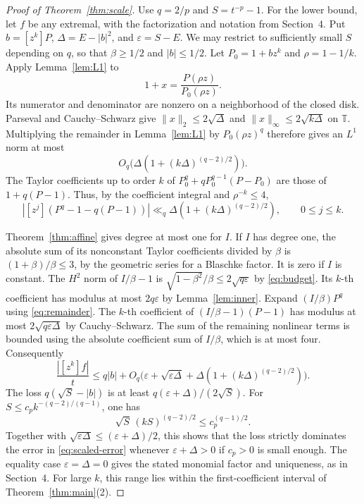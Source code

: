 \documentclass[11pt]{article}
\numberwithin{equation}{section}
\theoremstyle{remark}
\newcommand{\T}{\mathbb T}
\newcommand{\norm}[1]{\lVert #1\rVert}
\newcommand{\coef}[1]{[z^{#1}]}
\begin{document}
\begin{proof}[Proof of Theorem~\ref{thm:scale}]
Use \(q=2/p\) and \(S=t^{-p}-1\). For the lower bound, let \(f\)
be any extremal, with the factorization and notation from Section~4.
Put \(b=\coef{k}P\), \(\Delta=E-|b|^2\), and \(\varepsilon=S-E\).
We may restrict to sufficiently small \(S\) depending on \(q\),
so that \(\beta\ge1/2\) and \(|b|\le1/2\).
Let \(P_0=1+bz^k\) and \(\rho=1-1/k\).
Apply Lemma~\ref{lem:L1} to
\[
  1+x=\frac{P(\rho z)}{P_0(\rho z)} .
\]
Its numerator and denominator are nonzero on a neighborhood of the
closed disk. Parseval and Cauchy--Schwarz give
\(\norm{x}_2\le2\sqrt{\Delta}\) and
\(\norm{x}_\infty\le2\sqrt{k\Delta}\) on \(\T\).
Multiplying the remainder in Lemma~\ref{lem:L1} by \(P_0(\rho z)^q\)
therefore gives an \(L^1\) norm at most
\[
 O_q\bigl(\Delta(1+(k\Delta)^{(q-2)/2})\bigr).
\]
The Taylor coefficients up to order \(k\) of
\(P_0^q+qP_0^{q-1}(P-P_0)\) are those of \(1+q(P-1)\).
Thus, by the coefficient integral and \(\rho^{-k}\le4\),
\begin{equation}\label{eq:remainder}
 |\coef{j}(P^q-1-q(P-1))|
   \ll_q \Delta(1+(k\Delta)^{(q-2)/2}),\qquad 0\le j\le k .
\end{equation}

Theorem~\ref{thm:affine} gives degree at most one for \(I\).
If \(I\) has degree one, the absolute sum of its nonconstant
Taylor coefficients divided by \(\beta\) is
\((1+\beta)/\beta\le3\), by the geometric series for a Blaschke
factor. It is zero if \(I\) is constant.
The \(H^2\) norm of \(I/\beta-1\) is
\(\sqrt{1-\beta^2}/\beta\le2\sqrt{q\varepsilon}\) by
\eqref{eq:budget}. Its \(k\)-th coefficient has modulus at most
\(2q\varepsilon\) by Lemma~\ref{lem:inner}.
Expand \((I/\beta)P^q\) using \eqref{eq:remainder}.
The \(k\)-th coefficient of \((I/\beta-1)(P-1)\) has modulus at most
\(2\sqrt{q\varepsilon\Delta}\) by Cauchy--Schwarz.
The sum of the remaining nonlinear terms is bounded using the
absolute coefficient sum of \(I/\beta\), which is at most four.
Consequently
\begin{equation}\label{eq:scaled-error}
 \frac{|\coef{k}f|}{t}
   \le q|b|+O_q\bigl(\varepsilon+\sqrt{\varepsilon\Delta}
                 +\Delta(1+(k\Delta)^{(q-2)/2})\bigr).
\end{equation}
The loss \(q(\sqrt S-|b|)\) is at least
\(q(\varepsilon+\Delta)/(2\sqrt S)\).
For \(S\le c_p k^{-(q-2)/(q-1)}\), one has
\[
 \sqrt S\,(kS)^{(q-2)/2}\le c_p^{(q-1)/2}.
\]
Together with \(\sqrt{\varepsilon\Delta}\le(\varepsilon+\Delta)/2\),
this shows that the loss strictly dominates the error in
\eqref{eq:scaled-error} whenever \(\varepsilon+\Delta>0\) if \(c_p>0\)
is small enough. The equality case \(\varepsilon=\Delta=0\)
gives the stated monomial factor and uniqueness, as in Section~4.
For large \(k\), this range lies within the first-coefficient
interval of Theorem~\ref{thm:main}(2).


\end{proof}
\end{document}
